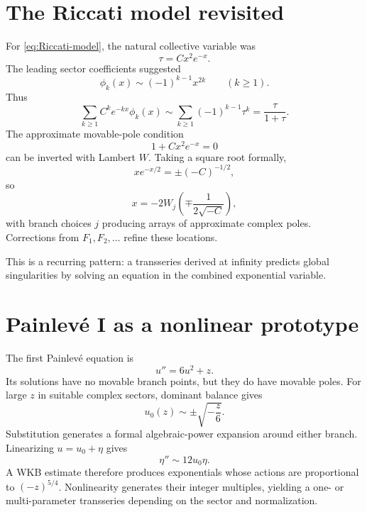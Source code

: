 \documentclass[11pt,openany]{book}
\theoremstyle{definition}
\theoremstyle{plain}
\theoremstyle{remark}
\begin{document}
\section{The Riccati model revisited}

For \cref{eq:Riccati-model}, the natural collective variable was
\[
 \tau=Cx^2e^{-x}.
\]
The leading sector coefficients suggested
\[
 \phi_k(x)\sim(-1)^{k-1}x^{2k}
 \qquad(k\ge1).
\]
Thus
\[
 \sum_{k\ge1}C^ke^{-kx}\phi_k(x)
 \sim\sum_{k\ge1}(-1)^{k-1}\tau^k
 =\frac{\tau}{1+\tau}.
\]
The approximate movable-pole condition
\begin{equation}\label{eq:riccati-pole-condition}
 1+Cx^2e^{-x}=0
\end{equation}
can be inverted with Lambert $W$. Taking a square root formally,
\[
 xe^{-x/2}=\pm(-C)^{-1/2},
\]
so
\begin{equation}\label{eq:riccati-poles-lambert}
 x=-2W_j\left(\mp\frac1{2\sqrt{-C}}\right),
\end{equation}
with branch choices $j$ producing arrays of approximate complex poles. Corrections from $F_1,F_2,\dots$ refine these locations.

This is a recurring pattern: a transseries derived at infinity predicts global singularities by solving an equation in the combined exponential variable.

\section{Painlev\'e I as a nonlinear prototype}

The first Painlev\'e equation is
\begin{equation}\label{eq:painleve-I}
 u''=6u^2+z.
\end{equation}
Its solutions have no movable branch points, but they do have movable poles. For large $z$ in suitable complex sectors, dominant balance gives
\begin{equation}\label{eq:painleve-leading}
 u_0(z)\sim\pm\sqrt{-\frac z6}.
\end{equation}
Substitution generates a formal algebraic-power expansion around either branch. Linearizing $u=u_0+\eta$ gives
\begin{equation}\label{eq:painleve-linearized}
 \eta''\sim12u_0\eta.
\end{equation}
A WKB estimate therefore produces exponentials whose actions are proportional to $(-z)^{5/4}$. Nonlinearity generates their integer multiples, yielding a one- or multi-parameter transseries depending on the sector and normalization.
\end{document}
